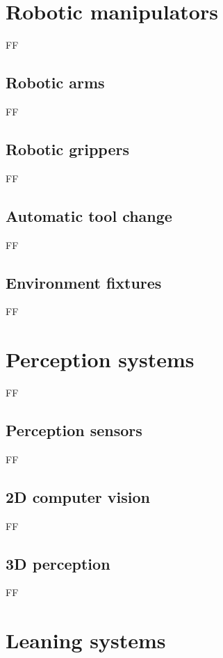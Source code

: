 \section{Robotic manipulators}

FF


\subsection{Robotic arms}

FF


\subsection{Robotic grippers}

FF


\subsection{Automatic tool change}

FF


\subsection{Environment fixtures}

FF


\section{Perception systems}

FF


\subsection{Perception sensors}

FF


\subsection{2D computer vision}

FF


\subsection{3D perception}

FF


\section{Leaning systems}

